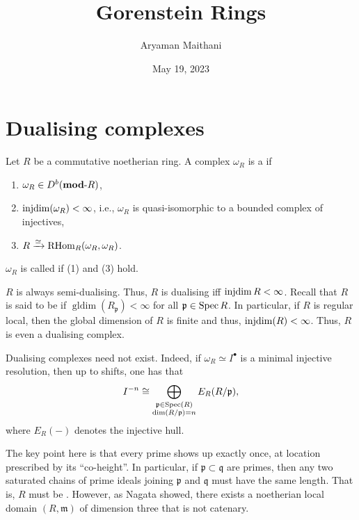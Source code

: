 \documentclass[12pt]{article}
\title{Gorenstein Rings}
\author{Aryaman Maithani}
\date{May 19, 2023}
\begin{document}
\maketitle

\section{Dualising complexes}

Let $R$ be a commutative noetherian ring. A complex $\omega_{R}$ is a  if
\begin{enumerate}[label=(\arabic*)]
	\item $\omega_{R} \in D^{b}(\mathbf{mod}\text{-}R)$,
	\item $\operatorname{injdim}(\omega_{R}) < \infty$, i.e., $\omega_{R}$ is quasi-isomorphic to a bounded complex of injectives,
	\item $R \xrightarrow{\simeq} \operatorname{RHom}_{R}(\omega_{R}, \omega_{R})$.
\end{enumerate}

$\omega_{R}$ is called  if (1) and (3) hold.

\begin{rem}
	$R$ is always semi-dualising. Thus, $R$ is dualising iff $\operatorname{injdim} R < \infty$. \newline
	Recall that $R$ is said to be  if $\operatorname{gldim}(R_{\mathfrak{p}}) < \infty$ for all $\mathfrak{p} \in \operatorname{Spec} R$. \newline
	In particular, if $R$ is regular local, then the global dimension of $R$ is finite and thus, $\operatorname{injdim}(R) < \infty$. Thus, $R$ is even a dualising complex.
\end{rem}

\begin{rem}[Existence]
	Dualising complexes need not exist. Indeed, if $\omega_{R} \simeq I^{\bullet}$ is a minimal injective resolution, then up to shifts, one has that
	\begin{equation*} 
		I^{-n} \cong \bigoplus_{\substack{\mathfrak{p} \in \operatorname{Spec}(R) \\ \dim(R/\mathfrak{p}) = n}} E_{R}(R/\mathfrak{p}),
	\end{equation*}
	where $E_{R}(-)$ denotes the injective hull. 

	The key point here is that every prime shows up exactly once, at location prescribed by its ``co-height''. In particular, if $\mathfrak{p} \subset \mathfrak{q}$ are primes, then any two saturated chains of prime ideals joining $\mathfrak{p}$ and $\mathfrak{q}$ must have the same length. That is, $R$ must be . \newline
	However, as Nagata showed, there exists a noetherian local domain $(R, \mathfrak{m})$ of dimension three that is not catenary. %
\end{rem}
\end{document}

